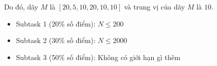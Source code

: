 \documentclass[12pt,a4paper,oneside]{article}
\begin{document}
Do đó, dãy $M$ là $[20, 5, 10, 20, 10, 10]$ và trung vị của dãy $M$ là $10$.


\begin{itemize}
\item Subtask 1 (20\% số điểm): $N \leq 200$
\item Subtask 2 (30\% số điểm): $N \leq 2000$
\item Subtask 3 (50\% số điểm): Không có giới hạn gì thêm
\end{itemize}
\end{document}
